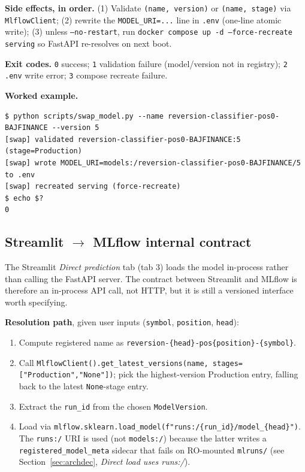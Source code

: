 \documentclass[11pt,a4paper]{article}
\begin{document}
\textbf{Side effects, in order.} (1) Validate \texttt{(name, version)} or \texttt{(name, stage)} via \texttt{MlflowClient}; (2) rewrite the \texttt{MODEL\_URI=...} line in \texttt{.env} (one-line atomic write); (3) unless \texttt{--no-restart}, run \texttt{docker compose up -d --force-recreate serving} so FastAPI re-resolves on next boot.

\textbf{Exit codes.} \texttt{0} success; \texttt{1} validation failure (model/version not in registry); \texttt{2} \texttt{.env} write error; \texttt{3} compose recreate failure.

\textbf{Worked example.}
\begin{lstlisting}[style=bashstyle]
$ python scripts/swap_model.py --name reversion-classifier-pos0-BAJFINANCE --version 5
[swap] validated reversion-classifier-pos0-BAJFINANCE:5 (stage=Production)
[swap] wrote MODEL_URI=models:/reversion-classifier-pos0-BAJFINANCE/5 to .env
[swap] recreated serving (force-recreate)
$ echo $?
0
\end{lstlisting}

\subsection{Streamlit $\to$ MLflow internal contract}

The Streamlit \emph{Direct prediction} tab (tab 3) loads the model in-process rather than calling the FastAPI server. The contract between Streamlit and MLflow is therefore an in-process API call, not HTTP, but it is still a versioned interface worth specifying.

\textbf{Resolution path}, given user inputs (\texttt{symbol}, \texttt{position}, \texttt{head}):
\begin{enumerate}[leftmargin=1.5em,itemsep=0pt]
  \item Compute registered name as \texttt{reversion-\{head\}-pos\{position\}-\{symbol\}}.
  \item Call \texttt{MlflowClient().get\_latest\_versions(name, stages=["Production","None"])}; pick the highest-version Production entry, falling back to the latest \texttt{None}-stage entry.
  \item Extract the \texttt{run\_id} from the chosen \texttt{ModelVersion}.
  \item Load via \texttt{mlflow.sklearn.load\_model(f"runs:/\{run\_id\}/model\_\{head\}")}. The \texttt{runs:/} URI is used (not \texttt{models:/}) because the latter writes a \texttt{registered\_model\_meta} sidecar that fails on RO-mounted \texttt{mlruns/} (see Section~\ref{sec:archdec}, \emph{Direct load uses runs:/}).
\end{enumerate}
\end{document}

